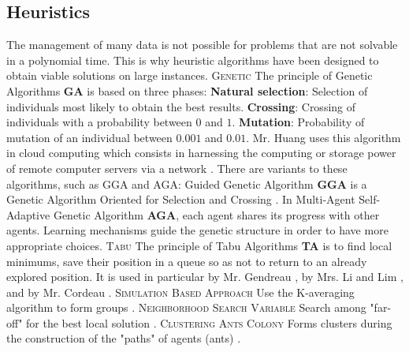 \documentclass[12pt, a4paper, twoside]{memoir}
\newcommand{\newpar}{\vskip 0.2in \noindent}
\begin{document}
{	\subsection{Heuristics}
	The management of many data is not possible for problems that are not solvable in a polynomial time. This is why heuristic algorithms have been designed to obtain viable solutions on large instances. 
	\newpar
	\textsc{Genetic}\newline
	The principle of Genetic Algorithms \textbf{GA} is based on three phases:\newline
	\textbf{Natural selection}: Selection of individuals most likely to obtain the best results. \newline
	\textbf{Crossing}: Crossing of individuals with a probability between $0$ and $1$. \newline
	\textbf{Mutation}: Probability of mutation of an individual between $0.001$ and $0.01$. \newline
	Mr. Huang uses this algorithm in cloud computing which consists in harnessing the computing or storage power of remote computer servers via a network \cite{huanggenetic-algorithm-based2015}. \newline
	There are variants to these algorithms, such as GGA and AGA: \newline
	Guided Genetic Algorithm \textbf{GGA} is a Genetic Algorithm Oriented for Selection and Crossing \cite{guometaheuristics2012}. In Multi-Agent Self-Adaptive Genetic Algorithm \textbf{AGA}, each agent shares its progress with other agents. Learning mechanisms guide the genetic structure in order to have more appropriate choices. \cite{guometaheuristics2012} 
	\newpar
	\textsc{Tabu}\newline
	The principle of Tabu Algorithms \textbf{TA} is to find local minimums, save their position in a queue so as not to return to an already explored position. It is used in particular by Mr. Gendreau \cite{gendreautabu1996}, by Mrs. Li and Lim \cite{limetaheuristic2003}, and by Mr. Cordeau \cite{cordeautabu2003}. 
	\newpar
	\textsc{Simulation Based Approach}\newline
	Use the K-averaging algorithm to form groups \cite{correiaconceptual2009}.
	\newpar
	\textsc{Neighborhood Search Variable}\newline
	Search among "far-off" for the best local solution \cite{polacekvariable2004}.
	\newpar
	\textsc{Clustering Ants Colony}\newline
	Forms clusters during the construction of the "paths" of agents (ants) \cite{mazzeoant2004} \cite{guometaheuristics2012}.
	
}
\end{document}

